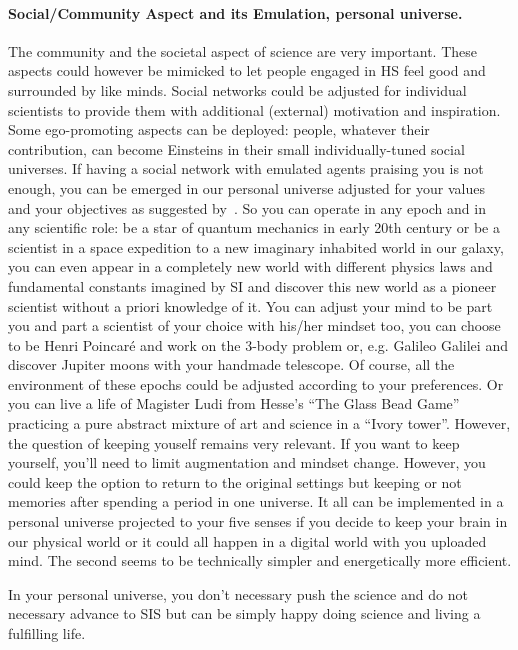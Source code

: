 \documentclass[a4paper,11pt]{article}
\begin{document}
\paragraph{Social/Community Aspect and its Emulation, personal universe.}
The community and the societal aspect of science are very important. These aspects could however be mimicked to let people engaged in HS feel good and surrounded by like minds. Social networks could be adjusted for individual scientists to provide them with additional (external) motivation and inspiration. Some ego-promoting aspects can be deployed: people, whatever their contribution, can become Einsteins in their small individually-tuned social universes. If having a social network with emulated agents praising you is not enough, you can be emerged in our personal universe adjusted for your values and your objectives as suggested by~\textcite{Yampolskiy2019}. So you can operate in any epoch and in any scientific role: be a star of quantum mechanics in early 20th century or be a scientist in a space expedition to a new imaginary inhabited world in our galaxy, you can even appear in a completely new world with different physics laws and fundamental constants imagined by SI and discover this new world as a pioneer scientist without a priori knowledge of it. You can adjust your mind to be part you and part a scientist of your choice with his/her mindset too, you can choose to be Henri Poincaré and work on the 3-body problem or, e.g. Galileo Galilei and discover Jupiter moons with your handmade telescope. Of course, all the environment of these epochs could be adjusted according to your preferences. Or you can live a life of Magister Ludi from Hesse's ``The Glass Bead Game'' practicing a pure abstract mixture of art and science in a ``Ivory tower''. However, the question of keeping youself remains very relevant. If you want to keep yourself, you'll need to limit augmentation and mindset change. However, you could keep the option to return to the original settings but keeping or not memories after spending a period in one universe. It all can be implemented in a personal universe projected to your five senses if you decide to keep your brain in our physical world or it could all happen in a digital world with you uploaded mind. The second seems to be technically simpler and energetically more efficient.

In your personal universe, you don't necessary push the science and do not necessary advance to SIS but can be simply happy doing science and living a fulfilling life.
\end{document}

